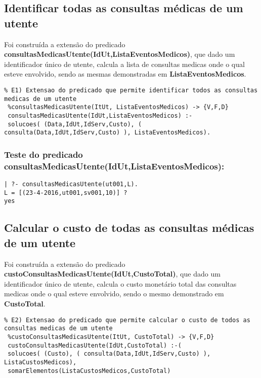 \documentclass[
  oneside,
  10pt, a4paper,
  footinclude=true,
  headinclude=true,
  cleardoublepage=empty
]{scrbook}
\begin{document}
\subsection{Identificar todas as consultas médicas de um utente}

Foi construída a extensão do predicado \textbf{consultasMedicasUtente(IdUt,ListaEventosMedicos)}, que dado um identificador único de utente, calcula a lista de consultas medicas onde o qual esteve envolvido, sendo as mesmas demonstradas em \textbf{ListaEventosMedicos}.\par 

\begin{lstlisting}
% E1) Extensao do predicado que permite identificar todos as consultas medicas de um utente
 %consultasMedicasUtente(ItUt, ListaEventosMedicos) -> {V,F,D}
 consultasMedicasUtente(IdUt,ListaEventosMedicos) :-
 solucoes( (Data,IdUt,IdServ,Custo), ( consulta(Data,IdUt,IdServ,Custo) ), ListaEventosMedicos).
\end{lstlisting}

\subsubsection{Teste do predicado \textbf{consultasMedicasUtente(IdUt,ListaEventosMedicos)}:}

\begin{lstlisting}
| ?- consultasMedicasUtente(ut001,L).
L = [(23-4-2016,ut001,sv001,10)] ? 
yes
\end{lstlisting}


















\subsection{Calcular o custo de todas as consultas médicas de um utente}





Foi construída a extensão do predicado \textbf{custoConsultasMedicasUtente(IdUt,CustoTotal)}, que dado um identificador único de utente, calcula o custo monetário total das consultas medicas onde o qual esteve envolvido, sendo o mesmo demonstrado em \textbf{CustoTotal}.\par 
\begin{lstlisting}
% E2) Extensao do predicado que permite calcular o custo de todos as consultas medicas de um utente
 %custoConsultasMedicasUtente(ItUt, CustoTotal) -> {V,F,D}
 custoConsultasMedicasUtente(IdUt,CustoTotal) :-(
 solucoes( (Custo), ( consulta(Data,IdUt,IdServ,Custo) ), ListaCustosMedicos),
 somarElementos(ListaCustosMedicos,CustoTotal)
\end{lstlisting}
\end{document}
